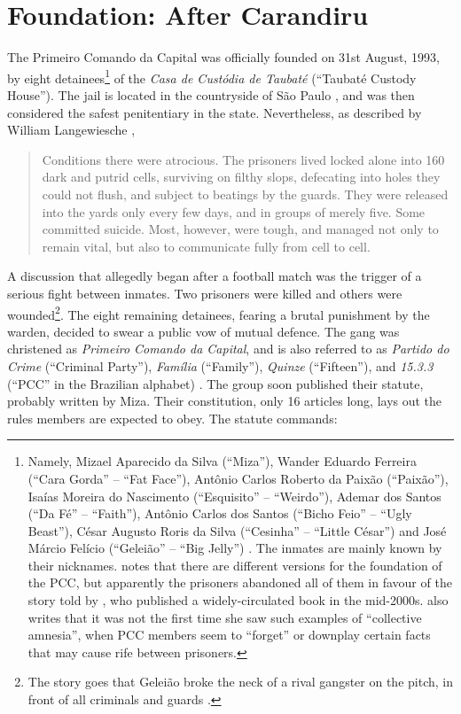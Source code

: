 
\section{Foundation: After Carandiru}

The Primeiro Comando da Capital was officially founded on 31st August, 1993, by eight detainees\footnote{Namely, Mizael Aparecido da Silva (``Miza''), Wander Eduardo Ferreira (``Cara Gorda'' -- ``Fat Face''), Ant\^{o}nio Carlos Roberto da Paix\~{a}o (``Paix\~{a}o''), Isa\'{i}as Moreira do Nascimento (``Esquisito''  -- ``Weirdo''), Ademar dos Santos (``Da F\'{e}'' -- ``Faith''), Ant\^{o}nio Carlos dos Santos (``Bicho Feio'' -- ``Ugly Beast''), C\'{e}sar Augusto Roris da Silva (``Cesinha'' -- ``Little C\'{e}sar'') and Jos\'{e} M\'{a}rcio Fel\'{i}cio (``Gelei\~{a}o'' -- ``Big Jelly'') \citep[]{folha2006criada}. The inmates are mainly known by their nicknames. \citet[69]{biondi2010junto} notes that there are different versions for the foundation of the PCC, but apparently the prisoners abandoned all of them in favour of the story told by \citet[]{jozino2004cobras}, who published a widely-circulated book in the mid-2000s. \citet[69]{biondi2010junto} also writes that it was not the first time she saw such examples of ``collective amnesia'', when PCC members seem to ``forget'' or downplay certain facts that may cause rife between prisoners.} of the \textit{Casa de Cust\'{o}dia de Taubat\'{e}} (``Taubat\'{e} Custody House''). The jail is located in the countryside of S\~{a}o Paulo \citep[60]{matos2009lado}, and was then considered the safest penitentiary in the state. Nevertheless, as described by William Langewiesche \citep[]{vanityfair2007pcc}, 

\begin{quotation}
Conditions there were atrocious. The prisoners lived locked alone into 160 dark and putrid cells, surviving on filthy slops, defecating into holes they could not flush, and subject to beatings by the guards. They were released into the yards only every few days, and in groups of merely five. Some committed suicide. Most, however, were tough, and managed not only to remain vital, but also to communicate fully from cell to cell.
\end{quotation}

A discussion that allegedly began after a football match was the trigger of a serious fight between inmates. Two prisoners were killed and others were wounded\footnote{The story goes that Gelei\~{a}o broke the neck of a rival gangster on the pitch, in front of all criminals and guards \citep[134]{santos2010dimensao}.}. The eight remaining detainees, fearing a brutal punishment by the warden, decided to swear a public vow of mutual defence. The gang was christened as \textit{Primeiro Comando da Capital}, and is also referred to as \textit{Partido do Crime} (``Criminal Party''), \textit{Fam\'{i}lia} (``Family''), \textit{Quinze} (``Fifteen''), and \textit{15.3.3} (``PCC'' in the Brazilian alphabet) \citep[25]{biondi2010junto}. The group soon published their statute, probably written by Miza. Their constitution, only 16 articles long, lays out the rules members are expected to obey. The statute commands:

